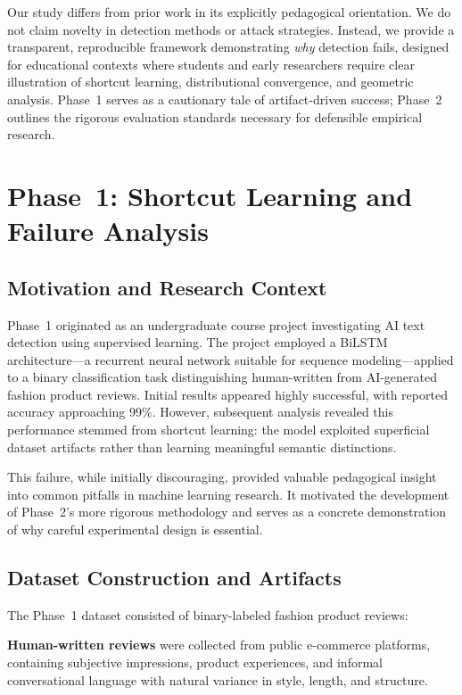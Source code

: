 \documentclass[conference]{IEEEtran}
\begin{document}
Our study differs from prior work in its explicitly pedagogical orientation. We do not claim novelty in detection methods or attack strategies. Instead, we provide a transparent, reproducible framework demonstrating \emph{why} detection fails, designed for educational contexts where students and early researchers require clear illustration of shortcut learning, distributional convergence, and geometric analysis. Phase~1 serves as a cautionary tale of artifact-driven success; Phase~2 outlines the rigorous evaluation standards necessary for defensible empirical research.

\section{Phase~1: Shortcut Learning and Failure Analysis}

\subsection{Motivation and Research Context}

Phase~1 originated as an undergraduate course project investigating AI text detection using supervised learning. The project employed a BiLSTM architecture—a recurrent neural network suitable for sequence modeling—applied to a binary classification task distinguishing human-written from AI-generated fashion product reviews. Initial results appeared highly successful, with reported accuracy approaching 99\%. However, subsequent analysis revealed this performance stemmed from shortcut learning: the model exploited superficial dataset artifacts rather than learning meaningful semantic distinctions.

This failure, while initially discouraging, provided valuable pedagogical insight into common pitfalls in machine learning research. It motivated the development of Phase~2's more rigorous methodology and serves as a concrete demonstration of why careful experimental design is essential.

\subsection{Dataset Construction and Artifacts}

The Phase~1 dataset consisted of binary-labeled fashion product reviews:

\textbf{Human-written reviews} were collected from public e-commerce platforms, containing subjective impressions, product experiences, and informal conversational language with natural variance in style, length, and structure.
\end{document}
